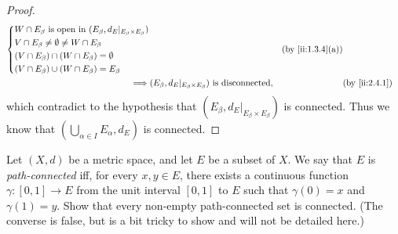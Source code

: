 \begin{proof}
\begin{align*}
\begin{dcases}
                 W \cap E_\beta \text{ is open in } (E_\beta, d_E|_{E_\beta \times E_\beta}) \\
                 V \cap E_\beta \neq \emptyset \neq W \cap E_\beta                           \\
                 (V \cap E_\beta) \cap (W \cap E_\beta) = \emptyset                          \\
                 (V \cap E_\beta) \cup (W \cap E_\beta) = E_\beta
               \end{dcases} &  & \by{ii:1.3.4}[a]                       \\
    \implies & (E_\beta, d_E|_{E_\beta \times E_\beta}) \text{ is disconnected},              &  & \by{ii:2.4.1}
  \end{align*}
  which contradict to the hypothesis that \((E_\beta, d_E|_{E_\beta \times E_\beta})\) is connected.
  Thus we know that \((\bigcup_{\alpha \in I} E_\alpha, d_E)\) is connected.
\end{proof}

\begin{ex}\label{ii:ex:2.4.7}
  Let \((X, d)\) be a metric space, and let \(E\) be a subset of \(X\).
  We say that \(E\) is \emph{path-connected} iff, for every \(x, y \in E\), there exists a continuous function \(\gamma : [0, 1] \to E\) from the unit interval \([0, 1]\) to \(E\) such that \(\gamma(0) = x\) and \(\gamma(1) = y\).
  Show that every non-empty path-connected set is connected.
  (The converse is false, but is a bit tricky to show and will not be detailed here.)
\end{ex}

